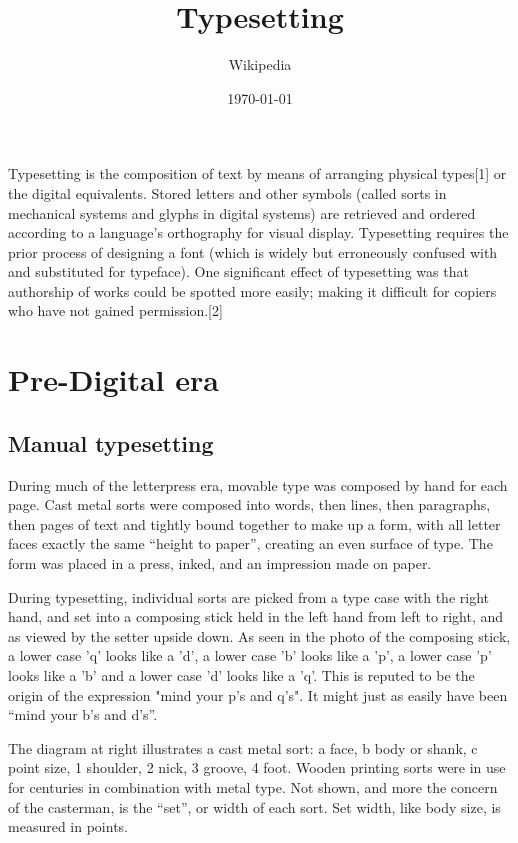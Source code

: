 \documentclass{article}
\title{Typesetting}
\author{Wikipedia}
\date{\today}
\begin{document}
\maketitle
\tableofcontents

Typesetting is the composition of text by means of arranging physical types[1] or the digital equivalents. Stored letters and other symbols (called sorts in mechanical systems and glyphs in digital systems) are retrieved and ordered according to a language's orthography for visual display. Typesetting requires the prior process of designing a font (which is widely but erroneously confused with and substituted for typeface). One significant effect of typesetting was that authorship of works could be spotted more easily; making it difficult for copiers who have not gained permission.[2]

\section{Pre-Digital era}

\subsection{Manual typesetting}

During much of the letterpress era, movable type was composed by hand for each page. Cast metal sorts were composed into words, then lines, then paragraphs, then pages of text and tightly bound together to make up a form, with all letter faces exactly the same “height to paper”, creating an even surface of type. The form was placed in a press, inked, and an impression made on paper.

During typesetting, individual sorts are picked from a type case with the right hand, and set into a composing stick held in the left hand from left to right, and as viewed by the setter upside down. As seen in the photo of the composing stick, a lower case 'q' looks like a 'd', a lower case 'b' looks like a 'p', a lower case 'p' looks like a 'b' and a lower case 'd' looks like a 'q'. This is reputed to be the origin of the expression "mind your p's and q's". It might just as easily have been “mind your b's and d's”.

The diagram at right illustrates a cast metal sort: a face, b body or shank, c point size, 1 shoulder, 2 nick, 3 groove, 4 foot. Wooden printing sorts were in use for centuries in combination with metal type. Not shown, and more the concern of the casterman, is the “set”, or width of each sort. Set width, like body size, is measured in points.
\end{document}
